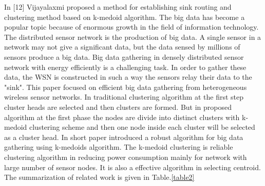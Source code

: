 \documentclass[MTech]{iitmdiss}
\begin{document}
In [12] Vijayalaxmi  proposed a  method for  establishing sink routing and clustering method based on k-medoid  algorithm. The big data has become a popular topic because of enormous growth in the field of information technology. The distributed sensor network is the production of big data. A single sensor in a network may not give a significant  data, but the data  sensed by millions of sensors produce a big data. Big data gathering in densely distributed sensor  network with energy efficiently is a challenging task. In order to gather these data, the WSN is constructed in  such a way the sensors relay their data to the "sink". This paper  focused on efficient big data gathering from heterogeneous 
wireless sensor networks. In traditional clustering algorithm at the first step cluster heads are selected and then clusters are formed. But in proposed algorithm at the first phase the nodes are divide into  distinct  clusters with k-medoid clustering scheme and  then one node inside each cluster will be selected as a cluster head. In short paper  introduced a robust algorithm for big data gathering using k-medoids algorithm. The k-medoid clustering  is reliable clustering algorithm in reducing power  consumption mainly for network with large number of  sensor nodes. It  is also a effective algorithm in  selecting centroid.
The summarization of related work is given in Table.\ref{table2}
\end{document}
